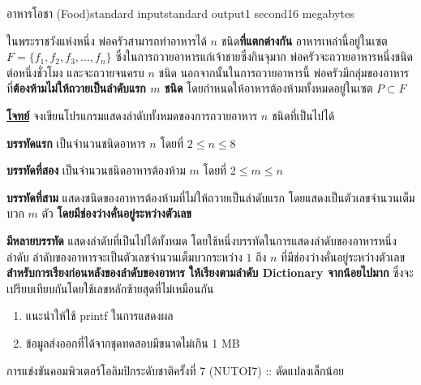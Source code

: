 \documentclass[11pt,a4paper]{article}
\begin{document}
\begin{problem}{อาหารโอชา (Food)}{standard input}{standard output}{1 second}{16 megabytes}

ในพระราชวังแห่งหนึ่ง พ่อครัวสามารถทำอาหารได้ $n$ ชนิด\textbf{ที่แตกต่างกัน} อาหารเหล่านี้อยู่ในเซต $F = \{f_1,f_2,f_3,…,f_n\}$ ซึ่งในการถวายอาหารแก่เจ้าชายซึ่งกินจุมาก พ่อครัวจะถวายอาหารหนึ่งชนิดต่อหนึ่งชั่วโมง และจะถวายจนครบ $n$ ชนิด นอกจากนั้นในการถวายอาหารนี้ พ่อครัวมีกลุ่มของอาหารที่\textbf{ต้องห้ามไม่ให้ถวายเป็นลำดับแรก $m$ ชนิด} โดยกำหนดให้อาหารต้องห้ามทั้งหมดอยู่ในเซต $P \subset F$

\underline{\textbf{โจทย์}} จงเขียนโปรแกรมแสดงลำดับทั้งหมดของการถวายอาหาร $n$ ชนิดที่เป็นไปได้

\InputFile
 \textbf{บรรทัดแรก} เป็นจำนวนชนิดอาหาร $n$ โดยที่ $2 \leq n \leq 8$

\textbf{บรรทัดที่สอง} เป็นจำนวนชนิดอาหารต้องห้าม $m$ โดยที่ $2 \leq m \leq n$

\textbf{บรรทัดที่สาม} แสดงชนิดของอาหารต้องห้ามที่ไม่ให้ถวายเป็นลำดับแรก โดยแสดงเป็นตัวเลขจำนวนเต็มบวก $m$ ตัว \textbf{โดยมีช่องว่างคั่นอยู่ระหว่างตัวเลข}

\OutputFile

\textbf{มีหลายบรรทัด} แสดงลำดับที่เป็นไปได้ทั้งหมด โดยใช้หนึ่งบรรทัดในการแสดงลำดับของอาหารหนึ่งลำดับ ลำดับของอาหารจะเป็นตัวเลขจำนวนเต็มบวกระหว่าง $1$ ถึง $n$ ที่มีช่องว่างคั่นอยู่ระหว่างตัวเลข \textbf{สำหรับการเรียงก่อนหลังของลำดับของอาหาร ให้เรียงตามลำดับ Dictionary จากน้อยไปมาก} ซึ่งจะเปรียบเทียบกันโดยใช้เลขหลักซ้ายสุดที่ไม่เหมือนกัน

\Examples

\begin{example}
%
%
\end{example}


\Note 
\begin{enumerate}

\item แนะนำให้ใช้ printf ในการแสดงผล
\item ข้อมูลส่งออกที่ได้จากชุดทดสอบมีขนาดไม่เกิน 1 MB \end{enumerate}

\Source

การแข่งขันคอมพิวเตอร์โอลิมปิกระดับชาติครั้งที่ 7 (NUTOI7) :: ดัดแปลงเล็กน้อย

\end{problem}
\end{document}
